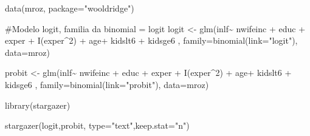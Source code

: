 \documentclass[
  letterpaper,
  DIV=11,
  numbers=noendperiod]{scrreprt}
\newenvironment{Shaded}{\begin{snugshade}}{\end{snugshade}}
\newcommand{\AttributeTok}[1]{\textcolor[rgb]{0.40,0.45,0.13}{#1}}
\newcommand{\CommentTok}[1]{\textcolor[rgb]{0.37,0.37,0.37}{#1}}
\newcommand{\DecValTok}[1]{\textcolor[rgb]{0.68,0.00,0.00}{#1}}
\newcommand{\FunctionTok}[1]{\textcolor[rgb]{0.28,0.35,0.67}{#1}}
\newcommand{\NormalTok}[1]{\textcolor[rgb]{0.00,0.23,0.31}{#1}}
\newcommand{\OtherTok}[1]{\textcolor[rgb]{0.00,0.23,0.31}{#1}}
\newcommand{\SpecialCharTok}[1]{\textcolor[rgb]{0.37,0.37,0.37}{#1}}
\newcommand{\StringTok}[1]{\textcolor[rgb]{0.13,0.47,0.30}{#1}}
\begin{document}
\begin{Shaded}
\begin{Highlighting}[]
\FunctionTok{data}\NormalTok{(mroz, }\AttributeTok{package=}\StringTok{"wooldridge"}\NormalTok{)}

\CommentTok{\#Modelo logit, familia da binomial = logit}
\NormalTok{logit }\OtherTok{\textless{}{-}} \FunctionTok{glm}\NormalTok{(inlf}\SpecialCharTok{\textasciitilde{}}\NormalTok{ nwifeinc }\SpecialCharTok{+}\NormalTok{ educ }\SpecialCharTok{+}\NormalTok{ exper }\SpecialCharTok{+} \FunctionTok{I}\NormalTok{(exper}\SpecialCharTok{\^{}}\DecValTok{2}\NormalTok{) }\SpecialCharTok{+} 
\NormalTok{                  age}\SpecialCharTok{+}\NormalTok{ kidslt6 }\SpecialCharTok{+}\NormalTok{ kidsge6 , }\AttributeTok{family=}\FunctionTok{binomial}\NormalTok{(}\AttributeTok{link=}\StringTok{"logit"}\NormalTok{), }\AttributeTok{data=}\NormalTok{mroz)}

\NormalTok{probit }\OtherTok{\textless{}{-}} \FunctionTok{glm}\NormalTok{(inlf}\SpecialCharTok{\textasciitilde{}}\NormalTok{ nwifeinc }\SpecialCharTok{+}\NormalTok{ educ }\SpecialCharTok{+}\NormalTok{ exper }\SpecialCharTok{+} \FunctionTok{I}\NormalTok{(exper}\SpecialCharTok{\^{}}\DecValTok{2}\NormalTok{) }\SpecialCharTok{+} 
\NormalTok{                  age}\SpecialCharTok{+}\NormalTok{ kidslt6 }\SpecialCharTok{+}\NormalTok{ kidsge6 , }\AttributeTok{family=}\FunctionTok{binomial}\NormalTok{(}\AttributeTok{link=}\StringTok{"probit"}\NormalTok{), }\AttributeTok{data=}\NormalTok{mroz)}


\FunctionTok{library}\NormalTok{(stargazer)}

\FunctionTok{stargazer}\NormalTok{(logit,probit, }\AttributeTok{type=}\StringTok{"text"}\NormalTok{,}\AttributeTok{keep.stat=}\StringTok{"n"}\NormalTok{)}
\end{Highlighting}
\end{Shaded}
\end{document}
